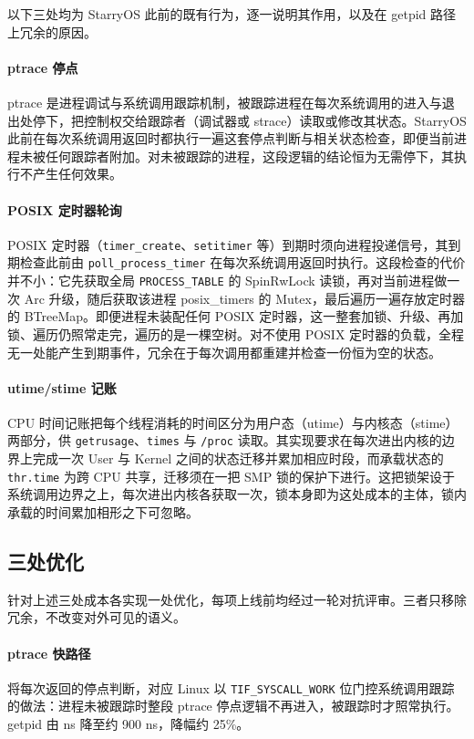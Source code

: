 以下三处均为 StarryOS 此前的既有行为，逐一说明其作用，以及在 getpid 路径上冗余的原因。

\paragraph{ptrace 停点}
ptrace 是进程调试与系统调用跟踪机制，被跟踪进程在每次系统调用的进入与退出处停下，把控制权交给跟踪者（调试器或 strace）读取或修改其状态。StarryOS 此前在每次系统调用返回时都执行一遍这套停点判断与相关状态检查，即便当前进程未被任何跟踪者附加。对未被跟踪的进程，这段逻辑的结论恒为无需停下，其执行不产生任何效果。

\paragraph{POSIX 定时器轮询}
POSIX 定时器（\texttt{timer\_create}、\texttt{setitimer} 等）到期时须向进程投递信号，其到期检查此前由 \texttt{poll\_process\_timer} 在每次系统调用返回时执行。这段检查的代价并不小：它先获取全局 \texttt{PROCESS\_TABLE} 的 SpinRwLock 读锁，再对当前进程做一次 Arc 升级，随后获取该进程 posix\_timers 的 Mutex，最后遍历一遍存放定时器的 BTreeMap。即便进程未装配任何 POSIX 定时器，这一整套加锁、升级、再加锁、遍历仍照常走完，遍历的是一棵空树。对不使用 POSIX 定时器的负载，全程无一处能产生到期事件，冗余在于每次调用都重建并检查一份恒为空的状态。

\paragraph{utime/stime 记账}
CPU 时间记账把每个线程消耗的时间区分为用户态（utime）与内核态（stime）两部分，供 \texttt{getrusage}、\texttt{times} 与 \texttt{/proc} 读取。其实现要求在每次进出内核的边界上完成一次 User 与 Kernel 之间的状态迁移并累加相应时段，而承载状态的 \texttt{thr.time} 为跨 CPU 共享，迁移须在一把 SMP 锁的保护下进行。这把锁架设于系统调用边界之上，每次进出内核各获取一次，锁本身即为这处成本的主体，锁内承载的时间累加相形之下可忽略。

\subsection{三处优化}

针对上述三处成本各实现一处优化，每项上线前均经过一轮对抗评审。三者只移除冗余，不改变对外可见的语义。

\paragraph{ptrace 快路径}
将每次返回的停点判断，对应 Linux 以 \texttt{TIF\_SYSCALL\_WORK} 位门控系统调用跟踪的做法：进程未被跟踪时整段 ptrace 停点逻辑不再进入，被跟踪时才照常执行。getpid 由 \nGetpidBefore{} ns 降至约 900 ns，降幅约 25\%。

